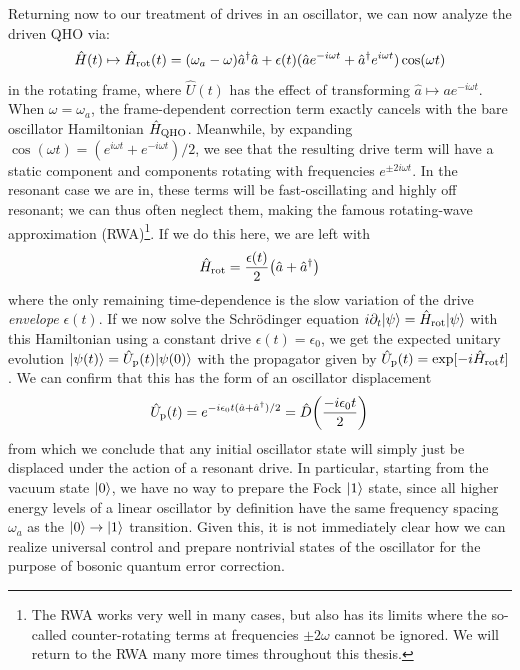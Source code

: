 Returning now to our treatment of drives in an oscillator, we can now analyze the driven QHO via:
\begin{equation}
    \hat{H}(t) \mapsto \hat{H}_{\rm rot}(t) = (\omega_a - \omega)\hat{a}^\dagger \hat{a} + \epsilon(t)(\hat{a} e^{-i\omega t} + \hat{a}^\dagger e^{i\omega t})\cos(\omega t)
\end{equation}
in the rotating frame, where $\hat{U}(t)$ has the effect of transforming $\hat{a} \mapsto a e^{-i\omega t}$. When $\omega = \omega_a$, the frame-dependent correction term exactly cancels with the bare oscillator Hamiltonian $\hat{H}_{\rm QHO}$. Meanwhile, by expanding $\cos(\omega t) = (e^{i\omega t} + e^{-i\omega t})/2$, we see that the resulting drive term will have a static component and components rotating with frequencies $e^{\pm 2i\omega t}$. In the resonant case we are in, these terms will be fast-oscillating and highly off resonant; we can thus often neglect them, making the famous rotating-wave approximation (RWA)\footnote{The RWA works very well in many cases, but also has its limits where the so-called counter-rotating terms at frequencies $\pm 2\omega$ cannot be ignored. We will return to the RWA many more times throughout this thesis.}. If we do this here, we are left with
\begin{equation}
    \hat{H}_{\rm rot} = \frac{\epsilon(t)}{2} \big(\hat{a} + \hat{a}^\dagger\big)
\end{equation}
where the only remaining time-dependence is the slow variation of the drive \textit{envelope} $\epsilon(t)$. If we now solve the Schr\"odinger equation $i\partial_t \lvert\psi\rangle = \hat{H}_{\rm rot}\lvert\psi\rangle$ with this Hamiltonian using a constant drive $\epsilon(t) = \epsilon_0$, we get the expected unitary evolution $\lvert\psi(t)\rangle = \hat{U}_{\rm p}(t) \lvert\psi(0)\rangle$ with the propagator given by $\hat{U}_{\rm p}(t) = \exp[-i\hat{H}_{\rm rot} t]$. We can confirm that this has the form of an oscillator displacement
\begin{equation}
    \hat{U}_{\rm p}(t) = e^{-i\epsilon_0 t(\hat{a} + \hat{a}^\dagger)/2} = \hat{D}\bigg(\frac{-i\epsilon_0 t}{2}\bigg)
\end{equation}
from which we conclude that any initial oscillator state will simply just be displaced under the action of a resonant drive. In particular, starting from the vacuum state $\lvert0\rangle$, we have no way to prepare the Fock $\lvert1\rangle$ state, since all higher energy levels of a linear oscillator by definition have the same frequency spacing $\omega_a$ as the $\lvert0\rangle\to\lvert1\rangle$ transition. Given this, it is not immediately clear how we can realize universal control and prepare nontrivial states of the oscillator for the purpose of bosonic quantum error correction.

